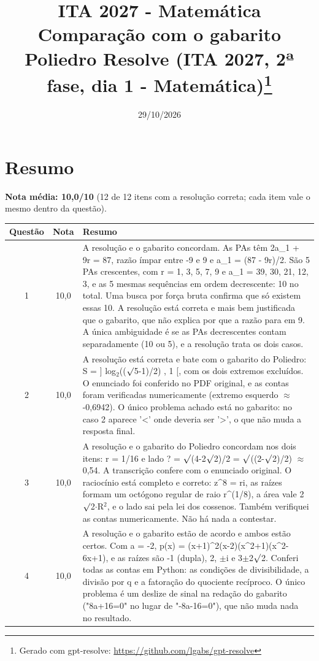 \documentclass{article}%
\title{ITA 2027 {-} Matemática\\[4pt]\large Comparação com o gabarito Poliedro Resolve (ITA 2027, 2ª fase, dia 1 {-} Matemática)\thanks{Gerado com gpt-resolve: \url{https://github.com/lgabs/gpt-resolve}}}%
\date{29/10/2026}%
\begin{document}
%
\normalsize%
\maketitle%
\section*{Resumo}\textbf{Nota média: 10,0/10} (12 de 12 itens com a resolução correta; cada item vale o mesmo dentro da questão).\par\medskip%
\begin{longtable}{@{}c c p{}@{}}\toprule Questão & Nota & Resumo \\ \midrule
1 & 10,0 & A resolução e o gabarito concordam. As PAs têm 2a\_1 + 9r = 87, razão ímpar entre -9 e 9 e a\_1 = (87 - 9r)/2. São 5 PAs crescentes, com r = 1, 3, 5, 7, 9 e a\_1 = 39, 30, 21, 12, 3, e as 5 mesmas sequências em ordem decrescente: 10 no total. Uma busca por força bruta confirma que só existem essas 10. A resolução está correta e mais bem justificada que o gabarito, que não explica por que a razão para em 9. A única ambiguidade é se as PAs decrescentes contam separadamente (10 ou 5), e a resolução trata os dois casos. \\
2 & 10,0 & A resolução está correta e bate com o gabarito do Poliedro: S = {]} log$_{2}$(($\surd$5-1)/2) , 1 {[}, com os dois extremos excluídos. O enunciado foi conferido no PDF original, e as contas foram verificadas numericamente (extremo esquerdo $\approx$ -0,6942). O único problema achado está no gabarito: no caso 2 aparece '<' onde deveria ser '>', o que não muda a resposta final. \\
3 & 10,0 & A resolução e o gabarito do Poliedro concordam nos dois itens: r = 1/16 e lado ? = $\surd$(4-2$\surd$2)/2 = $\surd$((2-$\surd$2)/2) $\approx$ 0,54. A transcrição confere com o enunciado original. O raciocínio está completo e correto: z\^{}8 = ri, as raízes formam um octógono regular de raio r\^{}(1/8), a área vale 2$\surd$2$\cdot$R$^2$, e o lado sai pela lei dos cossenos. Também verifiquei as contas numericamente. Não há nada a contestar. \\
4 & 10,0 & A resolução e o gabarito estão de acordo e ambos estão certos. Com a = -2, p(x) = (x+1)\^{}2(x-2)(x\^{}2+1)(x\^{}2-6x+1), e as raízes são -1 (dupla), 2, $\pm$i e 3$\pm$2$\surd$2. Conferi todas as contas em Python: as condições de divisibilidade, a divisão por q e a fatoração do quociente recíproco. O único problema é um deslize de sinal na redação do gabarito ("8a+16=0" no lugar de "-8a-16=0"), que não muda nada no resultado. \\

\end{longtable}
\end{document}
